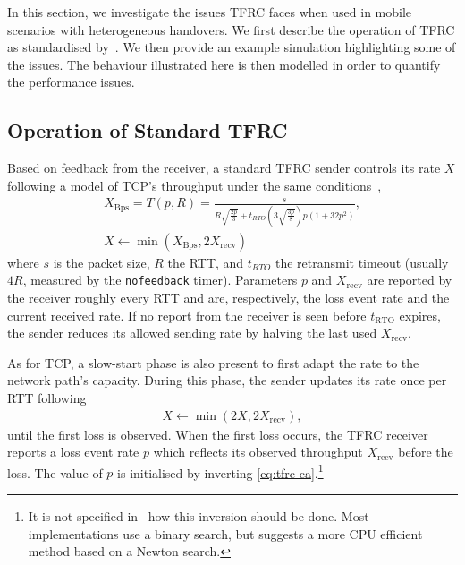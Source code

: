 \documentclass[twocolumn]{nictatechreport}
\begin{document}
In this section, we investigate the issues TFRC faces when used in mobile
scenarios with heterogeneous handovers. We first describe the operation of TFRC
as standardised by~\cite{rfc5348}.
We then provide an example simulation highlighting some of the issues.
The behaviour illustrated here  is then modelled in order to quantify the
performance issues.

\subsection{Operation of Standard TFRC}
\label{freezetfrc:standard}

Based on feedback from the receiver, a standard TFRC sender controls its rate
$X$ following a model of TCP's throughput under the same
conditions~\cite{1998padhye_tcp_model},
\begin{gather}
  \label{eq:tfrc-ca}
  X_\mathrm{Bps} = T(p,R) = \frac{s}{R\sqrt{\frac{2p}3} + t_{RTO}\left( 3\sqrt{\frac{3p}8}
  \right)p\left( 1+32p^2 \right)}, \\
  \label{eq:tfrc-update-x}
  X \leftarrow \min(X_\mathrm{Bps},2X_\mathrm{recv})
\end{gather}
where $s$ is the packet size, $R$ the RTT, and $t_{RTO}$ the retransmit timeout
(usually $4R$, measured by the \verb#nofeedback# timer).  Parameters $p$ and
$X_\mathrm{recv}$ are reported by the receiver roughly every RTT and are,
respectively, the loss event rate and the current received rate. If no report
from the receiver is seen before $t_\mathrm{RTO}$ expires, the sender reduces
its allowed sending rate by halving the last used $X_\mathrm{recv}$.

As for TCP, a slow-start phase is also present to first adapt the rate
to the network path's capacity. During this phase, the sender updates its rate
once per RTT following
\begin{gather}
  X \leftarrow \min(2X, 2X_\mathrm{recv}),
  \label{eq:tfrc-ss}
\end{gather}
until the first loss is observed.  When the first loss occurs, the TFRC receiver
reports a loss event rate $p$ which reflects its observed throughput
$X_\mathrm{recv}$ before the loss. The value of $p$ is initialised by inverting
\eqref{eq:tfrc-ca}.\footnote{It is not specified in~\cite{rfc5348} how this
inversion should be done. Most implementations use a binary search, but
\cite{2007jourjon_tfrc_initialization} suggests a more CPU efficient method
based on a Newton search.}
\end{document}
